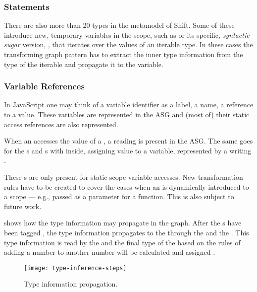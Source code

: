 \subsubsection{Statements}
There are also more than 20  types in the metamodel of Shift. Some of these introduce new, temporary variables in the scope, such as  or its specific, \emph{syntactic sugar} version, , that iterates over the values of an iterable type. In these cases the transforming graph pattern has to extract the inner type information from the type of the iterable and propagate it to the variable.

\subsubsection{Variable References}
In JavaScript one may think of a variable identifier as a label, a name, a reference to a value. These variables are represented in the ASG and (most of) their static access references are also represented.

When an  accesses the value of a , a reading  is present in the ASG. The same goes for the s and s with  inside, assigning value to a variable, represented by a writing .

These s are only present for static scope variable accesses. New transformation rules have to be created to cover the cases when an  is dynamically introduced to a scope --- e.g., passed as a parameter for a function. This is also subject to future work.

 shows how the type information may propagate in the graph. After the s have been tagged , the type information propagates to the   through the  and the . This type information is read by the   and the final type of the  based on the rules of adding a number to another number will be calculated and assigned .

\begin{figure}[htbp]
  \centering
  \texttt{[image: type-inference-steps]}
  \caption{Type information propagation.}
  \label{fig:type-propagation}
\end{figure}

